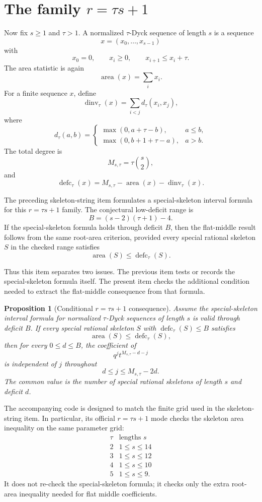 \documentclass{article}
\DeclareMathOperator{\area}{area}
\DeclareMathOperator{\dinv}{dinv}
\DeclareMathOperator{\defc}{defc}
\newtheorem{proposition}{Proposition}
\begin{document}
\section{The family $r=\tau s+1$}

Now fix \(s\ge1\) and \(\tau>1\).  A normalized \(\tau\)-Dyck sequence of
length \(s\) is a sequence
\[
  x=(x_0,\ldots,x_{s-1})
\]
with
\[
  x_0=0,\qquad x_i\ge0,\qquad x_{i+1}\le x_i+\tau.
\]
The area statistic is again
\[
  \area(x)=\sum_i x_i.
\]
For a finite sequence \(x\), define
\[
  \dinv_\tau(x)=\sum_{i<j} d_\tau(x_i,x_j),
\]
where
\[
  d_\tau(a,b)=
  \begin{cases}
    \max(0,a+\tau-b),& a\le b,\\
    \max(0,b+1+\tau-a),& a>b.
  \end{cases}
\]
The total degree is
\[
  M_{s,\tau}=\tau\binom{s}{2},
\]
and
\[
  \defc_\tau(x)=M_{s,\tau}-\area(x)-\dinv_\tau(x).
\]

The preceding skeleton-string item formulates a special-skeleton interval
formula for this \(r=\tau s+1\) family.  The conjectural low-deficit range is
\[
  B=(s-2)(\tau+1)-4.
\]
If the special-skeleton formula holds through deficit \(B\), then the
flat-middle result follows from the same root-area criterion, provided every
special rational skeleton \(S\) in the checked range satisfies
\[
  \area(S)\le \defc_\tau(S).
\]

Thus this item separates two issues.  The previous item tests or records the
special-skeleton formula itself.  The present item checks the additional
condition needed to extract the flat-middle consequence from that formula.

\begin{proposition}[Conditional \(r=\tau s+1\) consequence]
Assume the special-skeleton interval formula for normalized \(\tau\)-Dyck
sequences of length \(s\) is valid through deficit \(B\).  If every special
rational skeleton \(S\) with \(\defc_\tau(S)\le B\) satisfies
\[
  \area(S)\le \defc_\tau(S),
\]
then for every \(0\le d\le B\), the coefficient of
\[
  q^j t^{M_{s,\tau}-d-j}
\]
is independent of \(j\) throughout
\[
  d\le j\le M_{s,\tau}-2d.
\]
The common value is the number of special rational skeletons of length \(s\)
and deficit \(d\).
\end{proposition}

The accompanying code is designed to match the finite grid used in the
skeleton-string item.  In particular, its official \(r=\tau s+1\) mode checks
the skeleton area inequality on the same parameter grid:
\[
\begin{array}{c|c}
\tau & \text{lengths }s\\
\hline
2 & 1\le s\le 14\\
3 & 1\le s\le 12\\
4 & 1\le s\le 10\\
5 & 1\le s\le 9.
\end{array}
\]
It does not re-check the special-skeleton formula; it checks only the extra
root-area inequality needed for flat middle coefficients.
\end{document}

